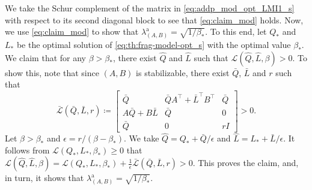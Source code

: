 \documentclass[9pt,shortpaper,twoside,web]{ieeecolor}
\begin{document}
We take the Schur complement of the matrix in \eqref{eq:addp_mod_opt_LMI1_s} with respect to its second diagonal block to see that \eqref{eq:claim_mod} holds. Now, we use \eqref{eq:claim_mod} to show that $\lambda_{(A,B)}^{\text{a}}=\sqrt{1/\beta_*}$. To this end, let $Q_*$ and $L_*$ be the optimal solution of \eqref{eq:th:frag-model-opt_s} with the optimal value $\beta_*$. We claim that for any $\beta >\beta_*$, there exist $\hat Q$ and $\hat L$ such that $\mathcal{L}(\hat Q,\hat L,\beta)>0$. To show this, note that since $(A,B)$ is stabilizable, there exist $\bar Q$, $\bar L$ and $r$ such that 
\begin{equation}
\label{eq:strict_LQ}
\bar{\mathcal{L}}(\bar Q,\bar L,r)\coloneqq \begin{bmatrix}
\bar Q & \bar Q A^\top+\bar L^\top B^\top  & \bar Q \\
A\bar Q+B\bar L & \bar Q  & 0 \\
\bar Q & 0  & r I
\end{bmatrix} >0.
\end{equation}
Let $\beta>\beta_*$ and $\epsilon=r/(\beta-\beta_*)$. We take $\hat Q=Q_*+\bar Q/\epsilon$ and $\hat L=L_*+\bar L/\epsilon$. It follows from $\mathcal{L}(Q_*,L_*,\beta_*) \geq 0$ that \mbox{$\mathcal{L}(\hat Q,\hat L,\beta)=\mathcal{L}(Q_*,L_*,\beta_*)+\frac{1}{\epsilon}  \bar{\mathcal{L}}(\bar Q,\bar L,r) >0$}. This proves the claim, and, in turn, it shows that $\lambda_{(A,B)}^{\text{a}}=\sqrt{1/\beta_*}$.
\end{document}
